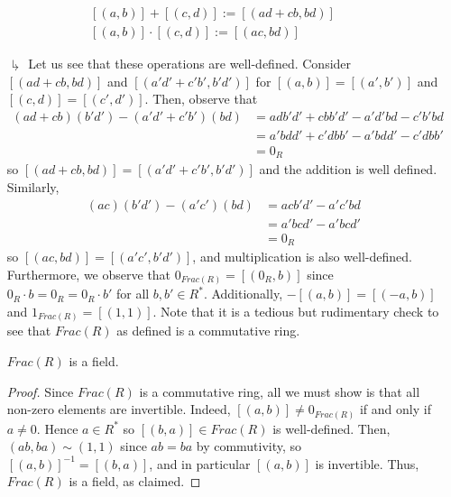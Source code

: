 \documentclass[12pt, a4paper, oneside, openright, titlepage]{book}
\begin{document}
\begin{cons}
\begin{enumerate}
\begin{equation}
            \begin{array}{l}
                [(a,b)] + [(c,d)] := [(ad+cb,bd)] \\
                {[(a,b)]}\cdot [(c,d)] := [(ac,bd)] 
            \end{array}
        \end{equation}
    \end{enumerate}
    \begin{enumerate}
        \item[$\drsh$] Let us see that these operations are well-defined. Consider $[(ad+cb,bd)]$ and $[(a'd'+c'b',b'd')]$ for $[(a,b)] = [(a',b')]$ and $[(c,d)] = [(c',d')]$. Then, observe that \begin{align*}
            (ad+cb)(b'd') - (a'd'+c'b')(bd) &= adb'd'+cbb'd' - a'd'bd - c'b'bd \\
            &= a'bdd' + c'dbb' - a'bdd' - c'dbb' \\
            &= 0_R
        \end{align*}
        so $[(ad+cb,bd)]=[(a'd'+c'b',b'd')]$ and the addition is well defined. Similarly, \begin{align*}
            (ac)(b'd')-(a'c')(bd) &= acb'd'-a'c'bd \\
            &= a'bcd' - a'bcd' \\
            &= 0_R
        \end{align*}
        so $[(ac,bd)] = [(a'c',b'd')]$, and multiplication is also well-defined. Furthermore, we observe that $0_{Frac(R)} = [(0_R,b)]$ since $0_R\cdot b = 0_R = 0_R \cdot b'$ for all $b,b' \in R^*$. Additionally, $-[(a,b)] = [(-a,b)]$ and $1_{Frac(R)} = [(1,1)]$. Note that it is a tedious but rudimentary check to see that $Frac(R)$ as defined is a commutative ring.
        \begin{claim}
            $Frac(R)$ is a field.
            \begin{proof}
                    Since $Frac(R)$ is a commutative ring, all we must show is that all non-zero elements are invertible. Indeed, $[(a,b)] \neq 0_{Frac(R)}$ if and only if $a \neq 0$. Hence $a \in R^*$ so $[(b,a)] \in Frac(R)$ is well-defined. Then, $(ab,ba) \sim (1,1)$ since $ab = ba$  by commutivity, so $[(a,b)]^{-1} = [(b,a)]$, and in particular $[(a,b)]$ is invertible. Thus, $Frac(R)$ is a field, as claimed.
            \end{proof}
        \end{claim}
    \end{enumerate}
\end{cons}
\end{document}
